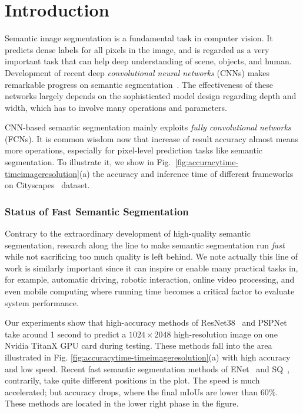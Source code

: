 \documentclass[runningheads]{llncs}
\begin{document}
\section{Introduction}
Semantic image segmentation is a fundamental task in computer vision. It predicts dense labels for all pixels in the image, and is regarded as a very important task that can help deep understanding of scene, objects, and human. Development of recent deep {\it convolutional neural networks} (CNNs) makes remarkable progress on semantic segmentation~\cite{long2015fully,chen2015semantic,badrinarayanan2015segnet,noh2015learning,zhao2017pspnet,wu2016wider}. The effectiveness of these networks largely depends on the sophisticated model design regarding depth and width, which has to involve many operations and parameters.

CNN-based semantic segmentation mainly exploits \textit{fully convolutional networks} (FCNs). It is common wisdom now that increase of result accuracy almost means more operations, especially for pixel-level prediction tasks like semantic segmentation. To illustrate it, we show in Fig.~\ref{fig:accuracytime-timeimageresolution}(a) the accuracy and inference time of different frameworks on Cityscapes~\cite{cordts2016cityscapes} dataset.

\subsubsection{Status of Fast Semantic Segmentation}
Contrary to the extraordinary development of high-quality semantic segmentation, research along the line to make semantic segmentation run {\it fast} while not sacrificing too much quality is left behind. We note actually this line of work is similarly important since it can inspire or enable many practical tasks in, for example, automatic driving, robotic interaction, online video processing, and even mobile computing where running time becomes a critical factor to evaluate system performance.

Our experiments show that high-accuracy methods of ResNet38~\cite{wu2016wider} and PSPNet~\cite{zhao2017pspnet} take around 1 second to predict a $1024\times 2048$ high-resolution image on one Nvidia TitanX GPU card during testing. These methods fall into the area illustrated in Fig. \ref{fig:accuracytime-timeimageresolution}(a) with high accuracy and low speed. Recent fast semantic segmentation methods of ENet~\cite{paszke2016enet} and SQ~\cite{treml2016speeding}, contrarily, take quite different positions in the plot. The speed is much accelerated; but accuracy drops, where the final mIoUs are lower than 60\%. These methods are located in the lower right phase in the figure.
\end{document}
